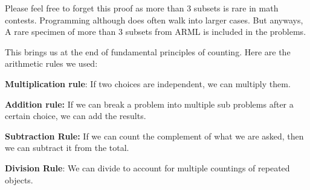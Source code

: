 Please feel free to forget this proof as more than $3$ subsets is rare in math contests. 
Programming although does often walk into larger cases. But anyways, A rare specimen of more than $3$ 
subsets from ARML is included in the problems.\par
This brings us at the end of fundamental principles of counting. Here are the arithmetic rules we used:
\begin{theorem}
    \textbf{Multiplication rule}: If two choices are independent, we can multiply them.\par
    \textbf{Addition rule:} If we can break a problem into multiple sub problems after a certain choice, 
    we can add the results.\par
    \textbf{Subtraction Rule:} If we can count the complement of what we are asked, 
    then we can subtract it from the total.\par
    \textbf{Division Rule}: We can divide to account for multiple countings of repeated objects.
\end{theorem}
